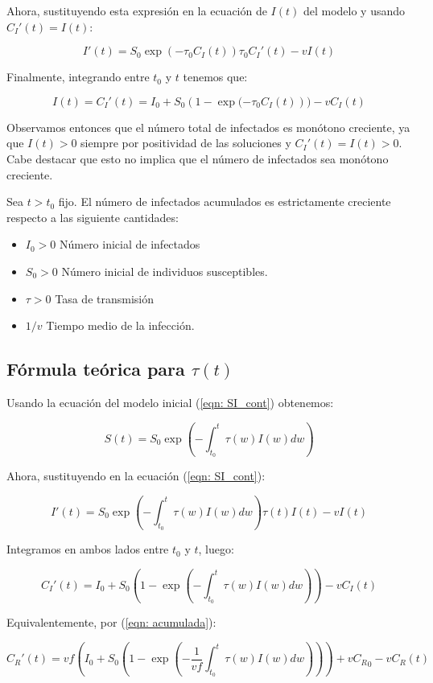 Ahora, sustituyendo esta expresión en la ecuación de $I(t)$ del modelo y usando $C_I'(t)=I(t)$:

$$I'(t) = S_0\exp{\left( -\tau_0 C_I(t)\right) }\tau_0 C_I'(t)-vI(t)$$

Finalmente, integrando entre $t_0$ y $t$ tenemos que:

$$I(t)=C_I'(t)=I_0+S_0(1-\exp{(-\tau_0 C_I(t)}))-vC_I(t)$$
 
Observamos entonces que el número total de infectados es monótono creciente, ya que $I(t)>0$ siempre por positividad de las soluciones y $C_I'(t)=I(t)>0$. Cabe destacar que esto no implica que el número de infectados sea monótono creciente.

\begin{theorem}
Sea $t>t_0$ fijo. El número de infectados acumulados es estrictamente creciente respecto a las siguiente cantidades:
\begin{itemize}
\item $I_0>0$ Número inicial de infectados
\item $S_0>0$ Número inicial de individuos susceptibles.
\item $\tau>0$ Tasa de transmisión
\item $1/v$ Tiempo medio de la infección.
\end{itemize}
\end{theorem}

\subsection{Fórmula teórica para $\tau (t)$}

Usando la ecuación del modelo inicial (\ref{eqn: SI_cont}) obtenemos:

$$S(t) = S_0 \exp{\left( - \int_{t_0}^t \tau(w) I(w) dw \right) } $$ 

Ahora, sustituyendo en la ecuación (\ref{eqn: SI_cont}):

$$I'(t) = S_0 \exp{\left( - \int_{t_0}^t \tau(w) I(w) dw \right) } \tau (t) I(t) -vI(t) $$

Integramos en ambos lados entre $t_0$ y $t$, luego:

$$ C_I'(t) = I_0 + S_0 \left( 1-\exp{\left(- \int_{t_0}^t \tau (w) I(w)dw \right)}\right) -vC_I(t)$$

Equivalentemente, por (\ref{eqn: acumulada}):

$$C_R'(t) = vf\left( I_0 + S_0 \left( 1-\exp{\left(- \frac{1}{vf}\int_{t_0}^t \tau (w ) I(w)dw \right)}\right)\right) +v{C_R}_0 -vC_R(t)$$

